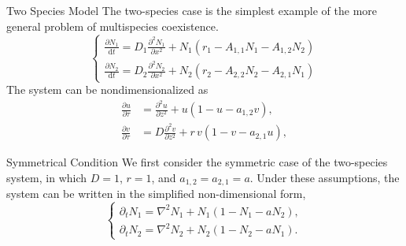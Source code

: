 \documentclass[aspectratio=169]{beamer}
\begin{document}
    \begin{frame}{Two Species Model}
        The two-species case is the simplest example of the more general problem of multispecies coexistence. 
        \begin{equation}
            \begin{cases}
                \frac{\partial N_1}{\mathrm{d}t} = D_{1}\frac{\partial^2 N_1}{\partial x^2} + N_1 \left( r_1 - A_{1,1} N_1 - A_{1,2} N_2 \right)\\ 
                \frac{\partial N_2}{\mathrm{d}t} = D_{2}\frac{\partial^2 N_2}{\partial x^2} + N_2 \left( r_2 - A_{2,2} N_2 - A_{2,1} N_1 \right)
            \end{cases}
        \end{equation}
        The system can be nondimensionalized as
        \begin{equation}
            \begin{aligned}
                \frac{\partial u}{\partial \tau} 
                &= \frac{\partial^2 u}{\partial z^2} 
                +  u \left( 1 - u - a_{1,2} v \right),\\ 
                \frac{\partial v}{\partial \tau} 
                &= D \frac{\partial^2 v}{\partial z^2} 
                + r\, v \left( 1 - v - a_{2,1} u \right),
            \end{aligned}
        \end{equation}
    \end{frame}

    \begin{frame}{Symmetrical Condition}
        We first consider the symmetric case of the two-species system, in which $D = 1$, $r = 1$, and $a_{1,2} = a_{2,1} = a$. Under these assumptions, the system can be written in the simplified non-dimensional form,
        \begin{equation*}
            \begin{cases}
                \partial_t N_{1} = \nabla^2 N_1 + N_1(1 - N_1 - a N_2),\\
                \partial_t N_{2} = \nabla^2 N_2 + N_2(1 - N_2 - a N_1).
            \end{cases}
        \end{equation*}
    \end{frame}
\end{document}
